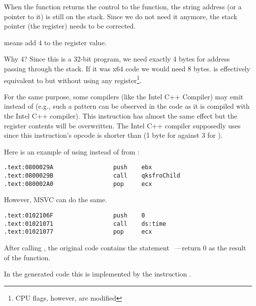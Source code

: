 When the \printf function returns the control to the \main function, the string address (or a pointer to it) is still on the stack.
Since we do not need it anymore, the \gls{stack pointer} (the \ESP register) needs to be corrected.

 means add 4 to the \ESP register value.

Why 4? Since this is a 32-bit program, we need exactly 4 bytes for address passing through the stack. If it was x64 code we would need 8 bytes.
 is effectively equivalent to  but without using any register\footnote{CPU flags, however, are modified}.

\myindex{\oracle}

For the same purpose, some compilers (like the Intel C++ Compiler) may emit 
instead of \ADD (e.g., such a pattern can be observed in the \oracle{} code as it is compiled with the Intel C++ compiler).
This instruction has almost the same effect but the \ECX register contents will be overwritten.
The Intel C++ compiler supposedly uses  since this instruction's opcode is shorter than  (1 byte for  against 3 for ).

Here is an example of using \POP instead of \ADD from \oracle{}:

\begin{lstlisting}[caption=\oracle 10.2 Linux (app.o file),style=customasmx86]
.text:0800029A                 push    ebx
.text:0800029B                 call    qksfroChild
.text:080002A0                 pop     ecx
\end{lstlisting}

However, MSVC can do the same.

\begin{lstlisting}[caption=MineSweeper from Windows 7 32-bit]
.text:0102106F                 push    0
.text:01021071                 call    ds:time
.text:01021077                 pop     ecx
\end{lstlisting}

After calling \printf, the original \CCpp code contains the statement ~---return 0 as the result of the \main function.

In the generated code this is implemented by the instruction .

